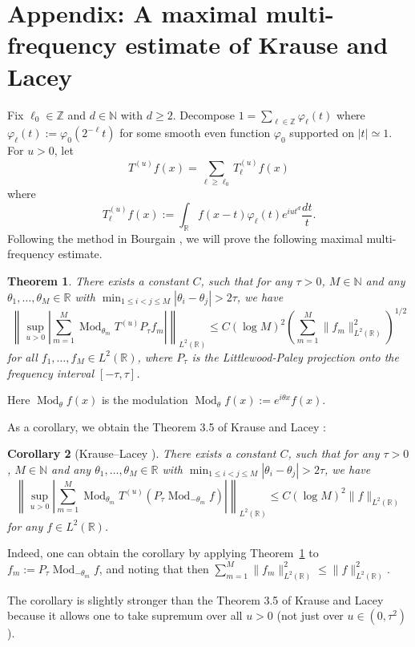 \documentclass[12pt,leqno]{amsart}
\def\R{\mathbb{R}}
\def\N{\mathbb{N}}
\def\Z{\mathbb{Z}}
\def\beq{\begin{equation}}
\def\endeq{\end{equation}}
\DeclareMathOperator{\Mod}{Mod}
\theoremstyle{plain}
\newtheorem{thm}{Theorem}[section]
\newtheorem{cor}[thm]{Corollary}
\numberwithin{equation}{section}
\begin{document}
\section{Appendix: A maximal multi-frequency estimate of Krause and Lacey} \label{sect:KL}

Fix $\ell_0 \in \Z$ and $d \in \N$ with $d \geq 2$. Decompose $1 = \sum_{\ell \in \Z} \varphi_{\ell}(t)$ where $\varphi_{\ell}(t) := \varphi_0(2^{-\ell} t)$ for some smooth even function $\varphi_0$ supported on $|t| \simeq 1$.
For $u > 0$, let 
$$
T^{(u)} f(x) = \sum_{\ell \geq \ell_0} T^{(u)}_{\ell} f(x)
$$
where
$$
T^{(u)}_{\ell} f(x) := \int_{\R} f(x-t) \varphi_{\ell}(t) e^{i u t^d} \frac{dt}{t}.
$$
Following the method in Bourgain \cite{MR1019960}, we will prove the following maximal multi-frequency estimate.

\begin{thm} \label{thm:KL}
There exists a constant $C$, such that for any $\tau > 0$, $M \in \N$ and any $\theta_1, \dots, \theta_M \in \R$ with $\min_{1 \leq i < j \leq M} |\theta_i - \theta_j| > 2\tau$, we have 
\beq \label{eq:multifreq}
\left \| \sup_{u > 0} \left | \sum_{m=1}^M \Mod_{\theta_m} T^{(u)} P_{\tau} f_m \right | \right \|_{L^2(\R)} \leq C (\log M)^2 \left ( \sum_{m=1}^M \|f_m\|_{L^2(\R)}^2 \right )^{1/2}
\endeq
for all $f_1, \dots, f_M \in L^2(\R)$, where $P_{\tau}$ is the Littlewood-Paley projection onto the frequency interval $[-\tau,\tau]$.
\end{thm}

Here $\Mod_{\theta} f(x)$ is the modulation $\Mod_{\theta} f(x) := e^{i \theta x} f(x)$.

As a corollary, we obtain the Theorem 3.5 of Krause and Lacey \cite{MR3658135}:
\begin{cor}[Krause--Lacey \cite{MR3658135}]
There exists a constant $C$, such that for any $\tau > 0$, $M \in \N$ and any $\theta_1, \dots, \theta_M \in \R$ with $\min_{1 \leq i < j \leq M} |\theta_i - \theta_j| > 2\tau$, we have
$$
\left \| \sup_{u > 0} \left | \sum_{m=1}^M \Mod_{\theta_m} T^{(u)} (P_{\tau}\Mod_{-\theta_m} f) \right | \right \|_{L^2(\R)} \leq C (\log M)^2 \|f\|_{L^2(\R)}
$$
for any $f \in L^2(\R)$.
\end{cor}

Indeed, one can obtain the corollary by applying Theorem~\ref{thm:KL} to $f_m := P_{\tau} \Mod_{-\theta_m} f$, and noting that then $\sum_{m=1}^M \|f_m\|_{L^2(\R)}^2 \leq \|f\|_{L^2(\R)}^2$.

The corollary is slightly stronger than the Theorem 3.5 of Krause and Lacey \cite{MR3658135} because it allows one to take supremum over all $u > 0$ (not just over $u \in (0, \tau^2)$).
\end{document}
